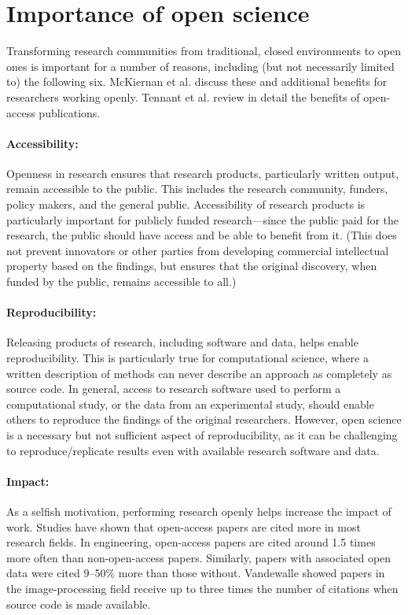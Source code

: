 \documentclass[nobib]{tufte-handout}
\begin{document}
\section{Importance of open science}
\label{sec:importance}

Transforming research communities from traditional, closed environments to open
ones is important for a number of reasons, including (but not necessarily limited
to) the following six. McKiernan et al.\autocite{McKiernan:2016iz} discuss these
and additional benefits for researchers working openly. Tennant et al.\autocite{Tennant:2016bi}
review in detail the benefits of open-access publications.

\paragraph{Accessibility:}
Openness in research ensures that research products,
particularly written output, remain accessible to the public. This includes the
research community, funders, policy makers, and the general public. Accessibility
of research products is particularly important for publicly funded
research---since the public paid for the research, the public should have access
and be able to benefit from it.
(This does not prevent innovators or other parties from developing commercial
intellectual property based on the findings, but ensures that the original
discovery, when funded by the public, remains accessible to all.)

\paragraph{Reproducibility:}
Releasing products of research, including software and data, helps enable
reproducibility. This is particularly true for computational science, where a
written description of methods can never describe an approach as completely as
source code. In general, access to research software used to perform a
computational study, or the data from an experimental study, should enable
others to reproduce the findings of the original researchers.
However, open science is a necessary but not sufficient aspect of reproducibility,
as it can be challenging to reproduce\slash replicate results even with
available research software and data\autocite{Mesnard:2016,Barba:2016ky}.

\paragraph{Impact:}
As a selfish motivation, performing research openly helps increase the impact of work.
Studies have shown that open-access papers are cited more in most research fields.
In engineering, open-access papers are cited around 1.5 times more often than
non-open-access papers. Similarly, papers with associated
open data were cited 9--50\% more than those
without\autocite{Piwowar:2013cc,McKiernan:2016iz}.
Vandewalle\autocite{Vandewalle:2012cl} showed papers in the image-processing
field receive up to three times the number of citations when source code is
made available.
\end{document}

